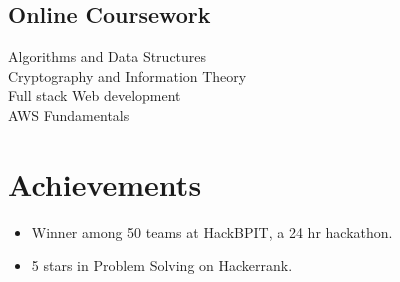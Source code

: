 \documentclass[letterpaper]{deedy-resume}
\begin{document}
\begin{minipage}[t]{0.29\textwidth}
\subsection{Online Coursework}
\sectionspace
Algorithms and Data Structures \\
Cryptography and Information Theory \\
Full stack Web development \\
AWS Fundamentals \\


\section{Achievements}
\begin{itemize}
\item Winner among 50 teams at HackBPIT, a 24 hr hackathon.
\item 5 stars in Problem Solving on Hackerrank.
\end{itemize}
\sectionspace 

\end{minipage} 
\hfill
%
%
\end{document}
